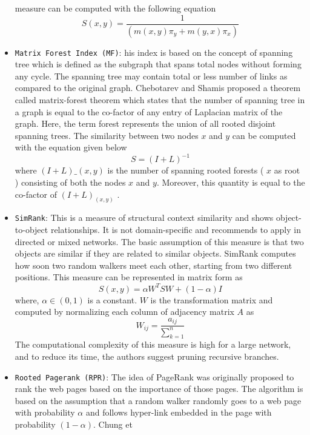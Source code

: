 \begin{itemize}
          measure can be computed with the following equation
          \[S(x, y) = \frac{1}{(m(x, y)\pi_y + m(y, x)\pi_x)}\]
    \item \texttt{Matrix\ Forest\ Index\ (MF)}: his index is based on the concept
          of spanning tree which is defined as the subgraph that spans total nodes
          without forming any cycle. The spanning tree may contain total or less
          number of links as compared to the original graph. Chebotarev and Shamis
          proposed a theorem called matrix-forest theorem which states that the
          number of spanning tree in a graph is equal to the co-factor of any
          entry of Laplacian matrix of the graph. Here, the term forest represents
          the union of all rooted disjoint spanning trees. The similarity between
          two nodes \(x\) and \(y\) can be computed with the equation given below
          \[S = (I + L)^{-1}\] where \((I + L)\_{(x,y)}\) is the number of
          spanning rooted forests ( \(x\) as root ) consisting of both the nodes
          \(x\) and \(y\). Moreover, this quantity is equal to the co-factor of
          \((I + L)_{(x,y)}\) .
    \item \texttt{SimRank}: This is a measure of
          structural context similarity and shows object-to-object relationships.
          It is not domain-specific and recommends to apply in directed or mixed
          networks. The basic assumption of this measure is that two objects are
          similar if they are related to similar objects. SimRank computes how
          soon two random walkers meet each other, starting from two different
          positions. This measure can be represented in matrix form as
          \[S(x,y) = \alpha W^T SW + (1 - \alpha)I\] where, \(\alpha \in (0, 1)\)
          is a constant. \(W\) is the transformation matrix and computed by
          normalizing each column of adjacency matrix \(A\) as
          \[
              W_{ij} = \frac{a_{ij}}{\sum_{k=1}^{n}}
          \]
          The computational complexity
          of this measure is high for a large network, and to reduce its time, the
          authors suggest pruning recursive branches.
    \item \texttt{Rooted\ Pagerank\ (RPR)}: The idea of PageRank was originally
          proposed to rank the web pages based on the importance of those pages.
          The algorithm is based on the assumption that a random walker randomly
          goes to a web page with probability \(\alpha\) and follows hyper-link
          embedded in the page with probability \((1 - \alpha)\). Chung et

\end{itemize}
